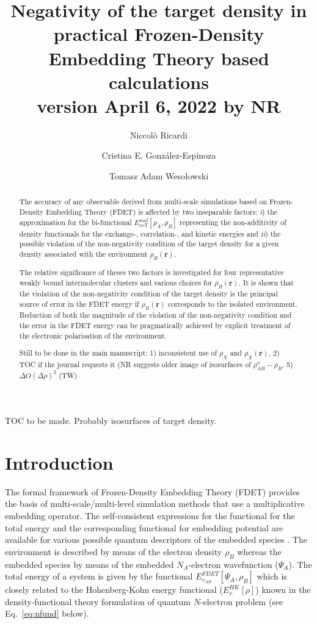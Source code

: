 \documentclass[journal=jctcce,manuscript=article]{achemso}
\author{Niccol\`{o} Ricardi}
\author{Cristina E. Gonz\'{a}lez-Espinoza}
\author{Tomasz Adam Weso\l{}owski}
\affiliation[University of Geneva]
{Department of Physical Chemistry, University of Geneva, Geneva (Switzerland)}
\title[Negativity of the target density]
  {Negativity of the target density in practical Frozen-Density Embedding Theory based calculations\\
  version April 6, 2022 by NR}
\newcommand{\nr}[1]{\color{red}#1\color{black}}
\begin{document}
\begin{tocentry}

TOC to be made. Probably isosurfaces of target density.

\end{tocentry}

\begin{abstract}
The accuracy of any observable derived from multi-scale simulations based on Frozen-Density Embedding Theory (FDET) is affected by two inseparable factors: {\it i}) the approximation for the bi-functional ${E}_{xcT}^{nad}[\rho_A,\rho_B]$ representing the non-additivity of density functionals for the exchange-, correlation-, and kinetic  energies and  {\it ii}) the possible violation of the non-negativity condition of the target density for a given density associated with the environment $\rho_B(\mathbf{r})$.

The relative significance of theses two factors is investigated for four representative weakly bound intermolecular clusters and various choices for $\rho_B(\mathbf{r})$.
It is shown that  the violation of the non-negativity condition of the target density is the principal source of error in the FDET energy
if $\rho_B(\mathbf{r})$ corresponds to the isolated environment.
Reduction of both the magnitude of the violation of the non-negativity condition and the error in the FDET energy can be pragmatically achieved by explicit treatment of the electronic polarisation of the environment.

{\color{red} Still to be done in the main manuscript:
1) inconsistent use of $\rho_X$ and $\rho_X(\mathbf{r})$, 
2) TOC if the journal requests it (NR suggests older image of isosurfaces of $\rho_{AB}^o -\rho_B$,
5) $\Delta O(\Delta\rho)^2$ (TW)
} 
\end{abstract}


\section{Introduction}\label{sec:intro}
The formal framework of 
Frozen-Density Embedding Theory (FDET) provides the basis of multi-scale/multi-level simulation methods that use a multiplicative embedding operator. The self-consistent expressions for the functional for the total energy and the corresponding functional for embedding potential are available for  various possible quantum descriptors of the embedded species \cite{Wesolowski1993,Wesolowski2008,Pernal2009,Wesolowski2015,Wesolowski2020}. 
The environment is described by means of the electron density $\rho_B$ whereas the embedded species by means of the 
embedded $N_A$-electron wavefunction ($\Psi_A$). The total energy of a system is given by the functional ${E}_{v_{AB}}^{FDET}[\Psi_{A},\rho_B]$ which is closely related to the Hohenberg-Kohn energy functional ($E_v^{HK}[\rho]$) known in \nr{the } density-functional theory \cite{Hohenberg1964} formulation of quantum $N$-electron problem (see Eq.~\ref{eq:nfund} below).
\end{document}
